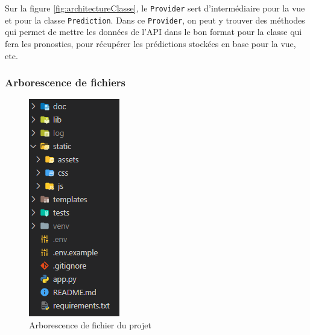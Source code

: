 \documentclass[a4paper,14pt]{extarticle}
\begin{document}
{Sur la figure \ref{fig:architectureClasse}, le \texttt{Provider} sert d'intermédiaire pour la vue et pour la classe \texttt{Prediction}. Dans ce \texttt{Provider}, on peut y trouver des méthodes qui permet de mettre les données de l'API dans le bon format pour la classe qui fera les pronostics, pour récupérer les prédictions stockées en base pour la vue, etc.

\subsubsection{Arborescence de fichiers}

\begin{figure}[htp]
    \centering
    \includegraphics{../img/arborescenceFichier.png}
    \caption{Arborescence de fichier du projet}
    \label{fig:arborescenceFichier}
\end{figure}

}
\end{document}
